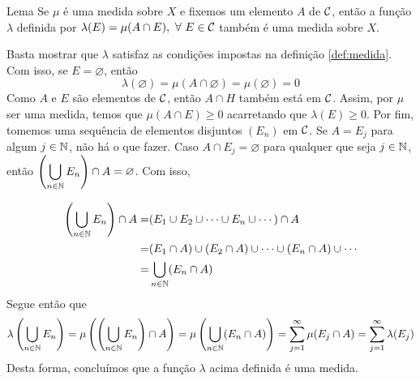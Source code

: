 \begin{env}{Lema}
	\label{lem:medida-da-intersecao-de-um-fixado}
	Se $\mu$ é uma medida sobre $X$ e fixemos um elemento $A$ de $\operatorname{\mathcal{C}}$, então a função $\lambda$ definida por $\lambda(E) = \mu(A\cap E), \ \forall\  E \in \cc$ também é uma medida sobre $X$.
\end{env}
\begin{prova}
	Basta mostrar que $\lambda$ satisfaz as condições impostas na definição \ref{def:medida}.
	Com isso, se $E = \varnothing$, então
	$$
	\lambda(\varnothing) = \mu(A \cap \varnothing) = \mu(\varnothing) = 0
	$$
	Como $A$ e $E$ são elementos de $\operatorname{\mathcal{C}}$, então $A \cap H$ também está em $\operatorname{\mathcal{C}}$.
	Assim, por $\mu$ ser uma medida, temos que $\mu(A\cap E) \geq 0$ acarretando que $\lambda(E) \geq 0$.
	Por fim, tomemos uma sequência de elementos disjuntos $(E_n)$ em $\operatorname{\mathcal{C}}$.
	Se $A = E_j$ para algum $j \in \operatorname{\mathbb{N}}$, não há o que fazer.
	Caso $A \cap E_j = \varnothing$ para qualquer que seja $j \in \operatorname{\mathbb{N}}$, então $\displaystyle \left( \bigcup_{n \in \operatorname{\mathbb{N}}} E_n\right) \cap A = \varnothing$.
	Com isso, 
	
	\begin{align*}
		\left( \bigcup_{n \in \operatorname{\mathbb{N}}} E_n\right) \cap A
		= &
		(E_1 \cup E_2 \cup \cdots \cup E_n \cup \cdots) \cap A\\
		= &
		(E_1 \cap A )\cup (E_2 \cap A) \cup \cdots \cup (E_n\cap A) \cup \cdots \\
		= &
		\bigcup_{n \in \operatorname{\mathbb{N}}} (E_n\cap A)    
	\end{align*}
	Segue então que
	$$
	\lambda\left( \bigcup_{n \in \operatorname{\mathbb{N}}} E_n\right)
	=
	\mu\left(\left( \bigcup_{n \in \operatorname{\mathbb{N}}} E_n\right) \cap A\right)
	=
	\mu\left( \bigcup_{n \in \operatorname{\mathbb{N}}} (E_n\cap A) \right)
	=
	\sum_{j = 1}^\infty \mu(E_j \cap A)
	= 
	\sum_{j = 1}^\infty \lambda(E_j)
	$$
	Desta forma, concluímos que a função $\lambda$ acima definida é uma medida.
\end{prova}

